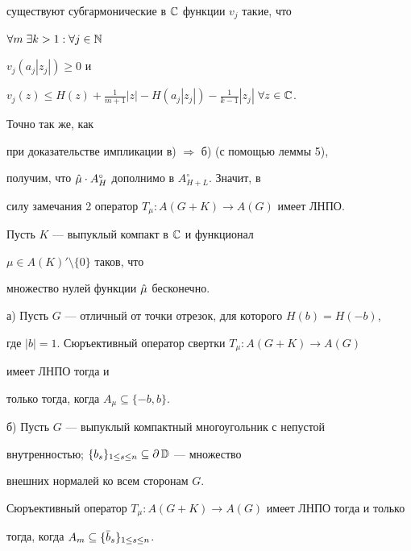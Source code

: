 \begin{pf}
существуют субгармонические в $\Bbb C$ функции $v_j$ такие, что 


$\forall m\; \exists k>1:\forall j\in\Bbb N$ 


$v_j(a_j|z_j|)\ge 0$ и 


$v_j(z)\le H(z)+\frac{1}{m+1}|z|-H(a_j|z_j|)- 


\frac{1}{k-1}|z_j|$ $\forall z\in\Bbb C$. 


Точно так же, как 


при доказательстве импликации в) $\Rightarrow$ б) (с помощью леммы 5), 


получим, что $\Hat\mu\cdot A^\circ_H$ дополнимо в $A^\circ_{H+L}$. Значит, в 


силу замечания 2 оператор $T_\mu :A(G+K)\to A(G)$ имеет ЛНПО. 


\end{pf} 


 


\begin{cornonum} Пусть $K$ --- выпуклый компакт в $\Bbb C$ и функционал 


$\mu\in A(K)'\setminus\{0\}$ таков, что 


множество нулей функции $\Hat\mu$ бесконечно. 


 


а) Пусть $G$ --- отличный от точки отрезок, для которого $H(b)=H(-b)$, 


где $|b|=1$. Сюръективный оператор свертки $T_\mu :A(G+K)\to A(G)$ 


имеет ЛНПО тогда и 


только тогда, когда $A_\mu\subseteq\{-b,b\}$. 


 


б) Пусть $G$ --- выпуклый компактный многоугольник с непустой 


внутренностью; $\{b_s\}_{1\le s\le n}\subseteq\partial\,\Bbb D$ --- множество 


внешних нормалей ко всем сторонам $G$. 


Сюръективный оператор $T_\mu :A(G+K)\to A(G)$ имеет ЛНПО тогда и только 


тогда, когда $A_m\subseteq\{\Bar b_s\}_{1\le s\le n}$. 


\end{cornonum} 


 



